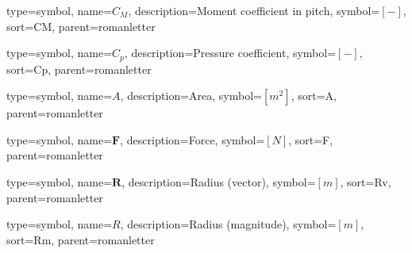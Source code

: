 {
type=symbol, %
name={\ensuremath{C_M}}, %
description={Moment coefficient in pitch}, %
symbol={$\left[-\right]$}, %
sort=CM, %
parent=romanletter %
}

{
	type=symbol, %
	name={\ensuremath{C_p}}, %
	description={Pressure coefficient}, %
	symbol={$\left[-\right]$}, %
	sort=Cp, %
	parent=romanletter %
}

{
type=symbol, %
name={\ensuremath{A}}, %
description={Area}, %
symbol={$\left[m^2\right]$}, %
sort=A, %
parent=romanletter %
}

{
type=symbol, %
name={\ensuremath{\mathbf{F}}}, %
description={Force}, %
symbol={$\left[N\right]$}, %
sort=F, %
parent=romanletter %
}

{
type=symbol, %
name={\ensuremath{\mathbf{R}}}, %
description={Radius (vector)}, %
symbol={$\left[m\right]$}, %
sort=Rv, %
parent=romanletter %
}

{
type=symbol, %
name={\ensuremath{R}}, %
description={Radius (magnitude)}, %
symbol={$\left[m\right]$}, %
sort=Rm, %
parent=romanletter %
}


